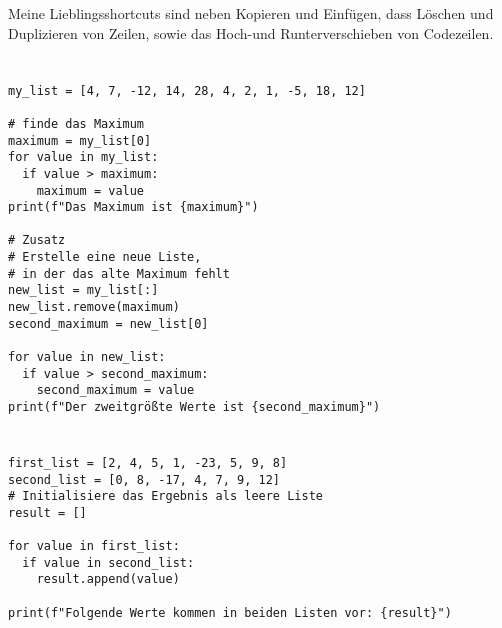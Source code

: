 \documentclass[a4paper]{article}
\begin{document}




\section{}
Meine Lieblingsshortcuts sind neben Kopieren und Einfügen, dass Löschen und Duplizieren von Zeilen, sowie das Hoch-und Runterverschieben von Codezeilen. 

\section{}
\begin{verbatim}
my_list = [4, 7, -12, 14, 28, 4, 2, 1, -5, 18, 12]

# finde das Maximum
maximum = my_list[0]
for value in my_list:
  if value > maximum:
    maximum = value
print(f"Das Maximum ist {maximum}")

# Zusatz
# Erstelle eine neue Liste,
# in der das alte Maximum fehlt
new_list = my_list[:]
new_list.remove(maximum)
second_maximum = new_list[0]

for value in new_list:
  if value > second_maximum:
    second_maximum = value
print(f"Der zweitgrößte Werte ist {second_maximum}")
\end{verbatim}

\section{} 
\begin{verbatim}
first_list = [2, 4, 5, 1, -23, 5, 9, 8]
second_list = [0, 8, -17, 4, 7, 9, 12]
# Initialisiere das Ergebnis als leere Liste
result = []

for value in first_list:
  if value in second_list:
    result.append(value)

print(f"Folgende Werte kommen in beiden Listen vor: {result}")
\end{verbatim}

\newpage 
\end{document}
